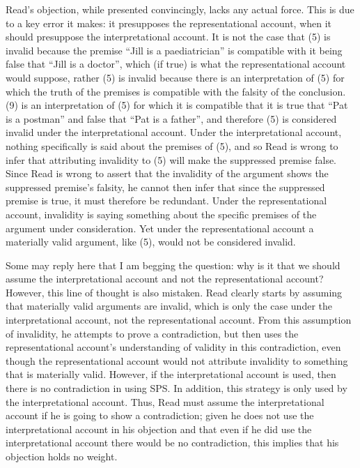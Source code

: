 Read's objection, while presented convincingly, lacks any actual force.
This is due to a key error it makes: it presupposes the representational
account, when it should presuppose the interpretational account. It is
not the case that (5) is invalid because the premise ``Jill is a
paediatrician'' is compatible with it being false that ``Jill is a
doctor'', which (if true) is what the representational account would
suppose, rather (5) is invalid because there is an interpretation of (5)
for which the truth of the premises is compatible with the falsity of
the conclusion. (9) is an interpretation of (5) for which it is
compatible that it is true that ``Pat is a postman'' and false that
``Pat is a father'', and therefore (5) is considered invalid under the
interpretational account. Under the interpretational account, nothing
specifically is said about the premises of (5), and so Read is wrong to
infer that attributing invalidity to (5) will make the suppressed
premise false. Since Read is wrong to assert that the invalidity of the
argument shows the suppressed premise's falsity, he cannot then infer
that since the suppressed premise is true, it must therefore be
redundant. Under the representational account, invalidity is saying
something about the specific premises of the argument under
consideration. Yet under the representational account a materially valid
argument, like (5), would not be considered invalid.

Some may reply here that I am begging the question: why is it that we
should assume the interpretational account and not the representational
account? However, this line of thought is also mistaken. Read clearly
starts by assuming that materially valid arguments are invalid, which is
only the case under the interpretational account, not the
representational account. From this assumption of invalidity, he
attempts to prove a contradiction, but then uses the representational
account's understanding of validity in this contradiction, even though
the representational account would not attribute invalidity to something
that is materially valid. However, if the interpretational account is
used, then there is no contradiction in using SPS. In addition, this
strategy is only used by the interpretational account. Thus, Read must
assume the interpretational account if he is going to show a
contradiction; given he does not use the interpretational account in his
objection and that even if he did use the interpretational account there
would be no contradiction, this implies that his objection holds no
weight.

